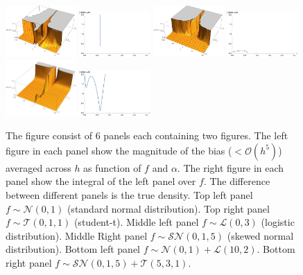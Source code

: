 \documentclass[
twoside,
openright,
titlepage,
numbers=noenddot,
headinclude,%
footinclude=true,
dottedtoc, %
ngerman,
american, %
pagesize=pdftex,
]{book}
\begin{document}
\begin{example}
\begin{figure}[H]
			\includegraphics[width=0.24\textwidth]{figures/snorm1}
			\includegraphics[width=0.24\textwidth]{figures/snorm2}
			\includegraphics[width=0.24\textwidth]{figures/mix01}
			\includegraphics[width=0.24\textwidth]{figures/mix1}
			\includegraphics[width=0.24\textwidth]{figures/mix02}
			\includegraphics[width=0.24\textwidth]{figures/mix2}
			\caption{The figure consist of 6 panels each containing two figures. The left figure in each panel show the magnitude of the bias ($<\mathcal{O}(h^5)$) averaged across $h$ as function of $f$ and $\alpha$. The right figure in each panel show the integral of the left panel over $f$. The difference between different panels is the true density. Top left panel $f\sim \mathcal{N}(0,1)$ (standard normal distribution). Top right panel $f\sim \mathcal{T}(0,1,1)$ (student-t). Middle left panel $f\sim \mathcal{L}(0,3)$ (logistic distribution). Middle Right panel $f\sim \mathcal{SN}(0,1,5)$ (skewed normal distribution). Bottom left panel $f\sim \mathcal{N}(0,1)+\mathcal{L}(10,2)$. Bottom right panel $f\sim \mathcal{SN}(0,1,5)+\mathcal{T}(5,3,1)$.}

\end{figure}
\end{example}
\end{document}
